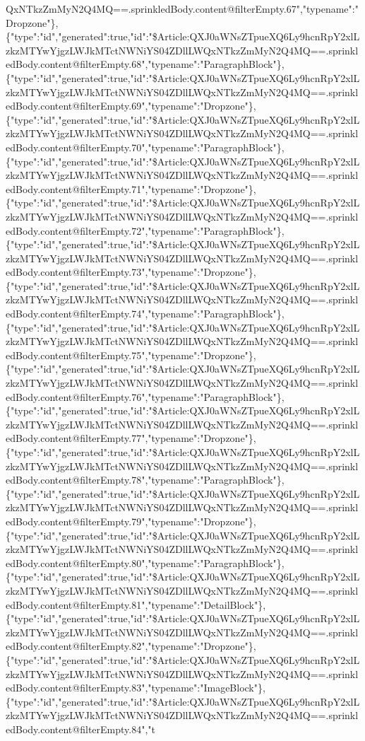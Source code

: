 QxNTkzZmMyN2Q4MQ==.sprinkledBody.content@filterEmpty.67","typename":"Dropzone"\},\{"type":"id","generated":true,"id":"\$Article:QXJ0aWNsZTpueXQ6Ly9hcnRpY2xlLzkzMTYwYjgzLWJkMTctNWNiYS04ZDllLWQxNTkzZmMyN2Q4MQ==.sprinkledBody.content@filterEmpty.68","typename":"ParagraphBlock"\},\{"type":"id","generated":true,"id":"\$Article:QXJ0aWNsZTpueXQ6Ly9hcnRpY2xlLzkzMTYwYjgzLWJkMTctNWNiYS04ZDllLWQxNTkzZmMyN2Q4MQ==.sprinkledBody.content@filterEmpty.69","typename":"Dropzone"\},\{"type":"id","generated":true,"id":"\$Article:QXJ0aWNsZTpueXQ6Ly9hcnRpY2xlLzkzMTYwYjgzLWJkMTctNWNiYS04ZDllLWQxNTkzZmMyN2Q4MQ==.sprinkledBody.content@filterEmpty.70","typename":"ParagraphBlock"\},\{"type":"id","generated":true,"id":"\$Article:QXJ0aWNsZTpueXQ6Ly9hcnRpY2xlLzkzMTYwYjgzLWJkMTctNWNiYS04ZDllLWQxNTkzZmMyN2Q4MQ==.sprinkledBody.content@filterEmpty.71","typename":"Dropzone"\},\{"type":"id","generated":true,"id":"\$Article:QXJ0aWNsZTpueXQ6Ly9hcnRpY2xlLzkzMTYwYjgzLWJkMTctNWNiYS04ZDllLWQxNTkzZmMyN2Q4MQ==.sprinkledBody.content@filterEmpty.72","typename":"ParagraphBlock"\},\{"type":"id","generated":true,"id":"\$Article:QXJ0aWNsZTpueXQ6Ly9hcnRpY2xlLzkzMTYwYjgzLWJkMTctNWNiYS04ZDllLWQxNTkzZmMyN2Q4MQ==.sprinkledBody.content@filterEmpty.73","typename":"Dropzone"\},\{"type":"id","generated":true,"id":"\$Article:QXJ0aWNsZTpueXQ6Ly9hcnRpY2xlLzkzMTYwYjgzLWJkMTctNWNiYS04ZDllLWQxNTkzZmMyN2Q4MQ==.sprinkledBody.content@filterEmpty.74","typename":"ParagraphBlock"\},\{"type":"id","generated":true,"id":"\$Article:QXJ0aWNsZTpueXQ6Ly9hcnRpY2xlLzkzMTYwYjgzLWJkMTctNWNiYS04ZDllLWQxNTkzZmMyN2Q4MQ==.sprinkledBody.content@filterEmpty.75","typename":"Dropzone"\},\{"type":"id","generated":true,"id":"\$Article:QXJ0aWNsZTpueXQ6Ly9hcnRpY2xlLzkzMTYwYjgzLWJkMTctNWNiYS04ZDllLWQxNTkzZmMyN2Q4MQ==.sprinkledBody.content@filterEmpty.76","typename":"ParagraphBlock"\},\{"type":"id","generated":true,"id":"\$Article:QXJ0aWNsZTpueXQ6Ly9hcnRpY2xlLzkzMTYwYjgzLWJkMTctNWNiYS04ZDllLWQxNTkzZmMyN2Q4MQ==.sprinkledBody.content@filterEmpty.77","typename":"Dropzone"\},\{"type":"id","generated":true,"id":"\$Article:QXJ0aWNsZTpueXQ6Ly9hcnRpY2xlLzkzMTYwYjgzLWJkMTctNWNiYS04ZDllLWQxNTkzZmMyN2Q4MQ==.sprinkledBody.content@filterEmpty.78","typename":"ParagraphBlock"\},\{"type":"id","generated":true,"id":"\$Article:QXJ0aWNsZTpueXQ6Ly9hcnRpY2xlLzkzMTYwYjgzLWJkMTctNWNiYS04ZDllLWQxNTkzZmMyN2Q4MQ==.sprinkledBody.content@filterEmpty.79","typename":"Dropzone"\},\{"type":"id","generated":true,"id":"\$Article:QXJ0aWNsZTpueXQ6Ly9hcnRpY2xlLzkzMTYwYjgzLWJkMTctNWNiYS04ZDllLWQxNTkzZmMyN2Q4MQ==.sprinkledBody.content@filterEmpty.80","typename":"ParagraphBlock"\},\{"type":"id","generated":true,"id":"\$Article:QXJ0aWNsZTpueXQ6Ly9hcnRpY2xlLzkzMTYwYjgzLWJkMTctNWNiYS04ZDllLWQxNTkzZmMyN2Q4MQ==.sprinkledBody.content@filterEmpty.81","typename":"DetailBlock"\},\{"type":"id","generated":true,"id":"\$Article:QXJ0aWNsZTpueXQ6Ly9hcnRpY2xlLzkzMTYwYjgzLWJkMTctNWNiYS04ZDllLWQxNTkzZmMyN2Q4MQ==.sprinkledBody.content@filterEmpty.82","typename":"Dropzone"\},\{"type":"id","generated":true,"id":"\$Article:QXJ0aWNsZTpueXQ6Ly9hcnRpY2xlLzkzMTYwYjgzLWJkMTctNWNiYS04ZDllLWQxNTkzZmMyN2Q4MQ==.sprinkledBody.content@filterEmpty.83","typename":"ImageBlock"\},\{"type":"id","generated":true,"id":"\$Article:QXJ0aWNsZTpueXQ6Ly9hcnRpY2xlLzkzMTYwYjgzLWJkMTctNWNiYS04ZDllLWQxNTkzZmMyN2Q4MQ==.sprinkledBody.content@filterEmpty.84","t